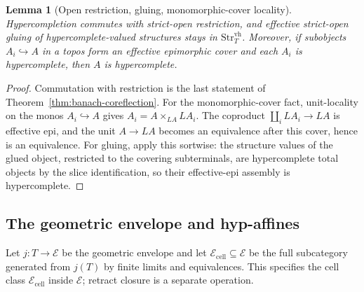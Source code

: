 \documentclass[12pt]{amsart}
\newtheorem{lem}[thm]{Lemma}
\theoremstyle{definition}
\theoremstyle{remark}
\numberwithin{equation}{section}
\newcommand{\E}{\mathcal E}
\begin{document}
\begin{lem}[Open restriction, gluing, monomorphic-cover locality]
\label{lem:banach-open-gluing}
Hypercompletion commutes with strict-open restriction, and effective
strict-open gluing of hypercomplete-valued structures stays in
$\mathrm{Str}_T^{\mathrm{vh}}$. Moreover, if subobjects
$A_i\hookrightarrow A$ in a topos form an effective epimorphic cover
and each $A_i$ is hypercomplete, then $A$ is hypercomplete.
\end{lem}

\begin{proof}
Commutation with restriction is the last statement of
Theorem~\ref{thm:banach-coreflection}. For the monomorphic-cover
fact, unit-locality on the monos $A_i\hookrightarrow A$ gives
$A_i=A\times_{L A}L A_i$. The coproduct $\coprod_i L A_i\to L A$ is
effective epi, and the unit $A\to L A$ becomes an equivalence after
this cover, hence is an equivalence. For gluing, apply this
sortwise: the structure values of the glued object, restricted to
the covering subterminals, are hypercomplete total objects by the
slice identification, so their effective-epi assembly is
hypercomplete.
\end{proof}

\subsection{The geometric envelope and hyp-affines}
\label{subsec:banach-envelope}

Let $j\colon T\to\E$ be the geometric envelope and let
$\E_{\mathrm{cell}}\subseteq\E$ be the full subcategory generated
from $j(T)$ by finite limits and equivalences. This specifies the
cell class $\E_{\mathrm{cell}}$ inside $\E$; retract closure is
a separate operation.
\end{document}

